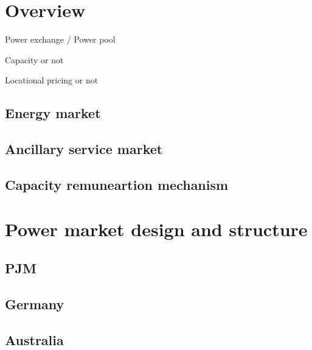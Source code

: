 \section{Overview}
Power exchange / Power pool

Capacity or not

Locational pricing or not
\subsection{Energy market}

\subsection{Ancillary service market}

\subsection{Capacity remuneartion mechanism}


\section{Power market design and structure}
\subsection{PJM}

\subsection{Germany}

\subsection{Australia}




